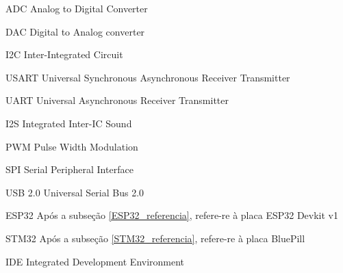 







\frenchspacing 


	\imprimircapa

	\imprimirfolhaderosto*

	\listoffigures*
	\cleardoublepage

	\listoftables*
	\cleardoublepage


	\begin{siglas}
		\item[ADC] Analog to Digital Converter
		\item[DAC] Digital to Analog converter
		\item[I2C] Inter-Integrated Circuit
		\item[USART] Universal Synchronous Asynchronous Receiver Transmitter
		\item[UART] Universal Asynchronous Receiver Transmitter
		\item[I2S] Integrated Inter-IC Sound
		\item[PWM] Pulse Width Modulation
		\item[SPI] Serial Peripheral Interface
		\item[USB 2.0] Universal Serial Bus 2.0
		\item[ESP32] Após a subseção \ref{ESP32_referencia}, refere-re à placa ESP32 Devkit v1
		\item[STM32] Após a subseção \ref{STM32_referencia}, refere-re à placa BluePill
		\item[IDE] Integrated Development Environment
	\end{siglas}

	\tableofcontents*
	\cleardoublepage


\textual

	

